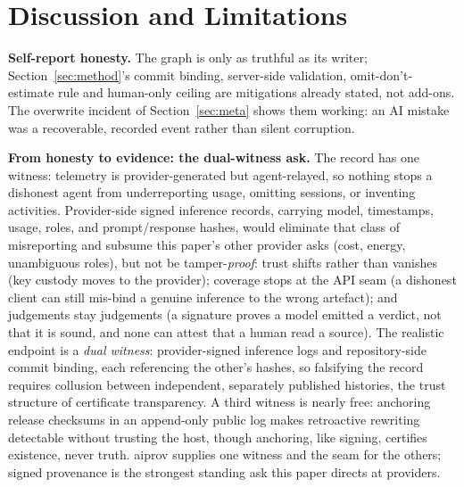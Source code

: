 \section{Discussion and Limitations}\label{sec:discussion}

\textbf{Self-report honesty.} The graph is only as truthful as its
writer; Section~\ref{sec:method}'s commit binding, server-side
validation, omit-don't-estimate rule and human-only ceiling are
mitigations already stated, not add-ons. The overwrite incident of
Section~\ref{sec:meta} shows them working: an AI mistake was a
recoverable, recorded event rather than silent corruption.

\textbf{From honesty to evidence: the dual-witness ask.} The record
has one witness: telemetry is provider-generated but agent-relayed,
so nothing stops a dishonest agent from underreporting usage,
omitting sessions, or inventing activities. Provider-side signed
inference records, carrying model, timestamps, usage, roles, and
prompt/response hashes, would eliminate that class of misreporting
and subsume this paper's other provider asks (cost, energy,
unambiguous roles), but not be tamper-\emph{proof}: trust shifts
rather than vanishes (key custody moves to the provider); coverage
stops at the API seam (a dishonest client can still mis-bind a
genuine inference to the wrong artefact); and judgements stay
judgements (a signature proves a model emitted a verdict, not that
it is sound, and none can attest that a human read a source). The
realistic endpoint is a \emph{dual witness}: provider-signed
inference logs and repository-side commit binding, each referencing
the other's hashes, so falsifying the record requires collusion
between independent, separately published histories, the trust
structure of certificate transparency. A third witness is nearly
free: anchoring release checksums in an append-only public log makes
retroactive rewriting detectable without trusting the host, though
anchoring, like signing, certifies existence, never truth. aiprov
supplies one witness and the seam for the others; signed provenance
is the strongest standing ask this paper directs at providers.

